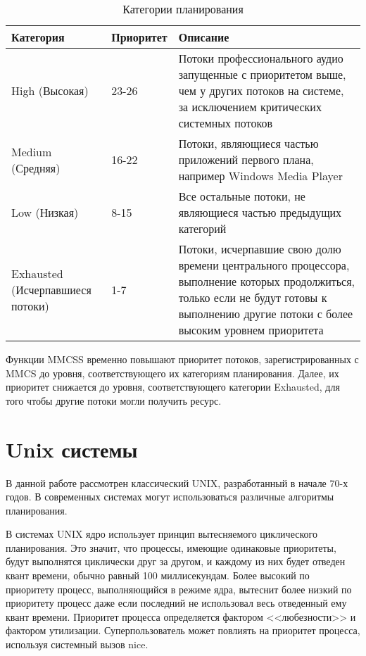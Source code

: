 \begin{table}[ht!]
	\caption{Категории планирования}
	\begin{center}
		\begin{tabular}{|p{}|p{}|p{}|}
			\hline
			Категория & Приоритет & Описание \\ \hline
			High (Высокая)  & 23-26 & Потоки профессионального аудио запущенные с приоритетом выше, чем у других потоков на системе, за исключением критических системных потоков \\ \hline
			Medium (Средняя) & 16-22 & Потоки, являющиеся частью приложений первого плана, например Windows Media Player \\ \hline
			Low (Низкая) & 8-15 & Все остальные потоки, не являющиеся частью предыдущих категорий \\  \hline
			Exhausted (Исчерпавшиеся потоки) & 1-7 & Потоки, исчерпавшие свою долю времени центрального процессора, выполнение которых продолжиться, только если не будут готовы к выполнению другие потоки с более высоким уровнем приоритета \\ \hline
		\end{tabular}
	\end{center}
\end{table}

Функции MMCSS временно повышают приоритет потоков, зарегистрированных с MMCS до уровня, соответствующего их категориям планирования. Далее, их приоритет снижается до уровня, соответствующего категории Exhausted, для того чтобы другие потоки могли получить ресурс.

\section{Unix системы}
В данной работе рассмотрен классический UNIX, разработанный в начале 70-х годов. В современных системах могут использоваться различные алгоритмы планирования. 

В системах UNIX ядро использует принцип вытесняемого циклического планирования. Это значит, что процессы, имеющие одинаковые приоритеты, будут выполнятся циклически друг за другом, и каждому из них будет отведен квант времени, обычно равный 100 миллисекундам. Более высокий по приоритету процесс, выполняющийся в режиме ядра, вытеснит более низкий по приоритету процесс  даже если последний не использовал весь отведенный ему квант времени. 
Приоритет процесса определяется фактором <<любезности>> и фактором утилизации. Суперпользователь может повлиять на приоритет процесса, используя системный вызов nice. %

